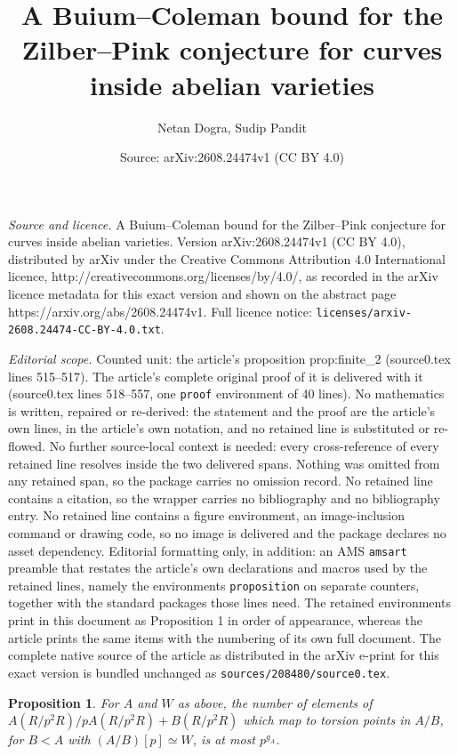\documentclass[10pt,a4paper]{amsart}
\title{A Buium--Coleman bound for the Zilber--Pink conjecture for curves inside abelian varieties}
\author{Netan Dogra, Sudip Pandit}
\date{Source: arXiv:2608.24474v1 (CC BY 4.0)}
\newtheorem{proposition}{Proposition}
\begin{document}
\maketitle

\noindent\emph{Source and licence.} A Buium--Coleman bound for the Zilber--Pink conjecture for curves inside abelian varieties. Version arXiv:2608.24474v1 (CC BY 4.0), distributed by arXiv under the Creative Commons Attribution 4.0 International licence, http://creativecommons.org/licenses/by/4.0/, as recorded in the arXiv licence metadata for this exact version and shown on the abstract page https://arxiv.org/abs/2608.24474v1. Full licence notice: \texttt{licenses/arxiv-2608.24474-CC-BY-4.0.txt}.\par\smallskip

\noindent\textit{Editorial scope.} Counted unit: the article's proposition prop:finite\_2 (source0.tex lines 515--517). The article's complete original proof of it is delivered with it (source0.tex lines 518--557, one \texttt{proof} environment of 40 lines). No mathematics is written, repaired or re-derived: the statement and the proof are the article's own lines, in the article's own notation, and no retained line is substituted or re-flowed.  No further source-local context is needed: every cross-reference of every retained line resolves inside the two delivered spans.  Nothing was omitted from any retained span, so the package carries no omission record.  No retained line contains a citation, so the wrapper carries no bibliography and no bibliography entry.  No retained line contains a figure environment, an image-inclusion command or drawing code, so no image is delivered and the package declares no asset dependency.  Editorial formatting only, in addition: an AMS \texttt{amsart} preamble that restates the article's own declarations and macros used by the retained lines, namely the environments \texttt{proposition} on separate counters, together with the standard packages those lines need.  The retained environments print in this document as Proposition 1 in order of appearance, whereas the article prints the same items with the numbering of its own full document.  The complete native source of the article as distributed in the arXiv e-print for this exact version is bundled unchanged as \texttt{sources/208480/source0.tex}.
\begin{proposition}\label{prop:finite_2}
For $A$ and $W$ as above, the number of elements of $A(R/p^2 R)/pA(R/p^2 R)+B(R/p^2 R)$ which map to torsion points in $A/B$, for $B<A$ with $(A/B)[p]\simeq W$, is at most $p^{g_A}$.
\end{proposition}
\end{document}
